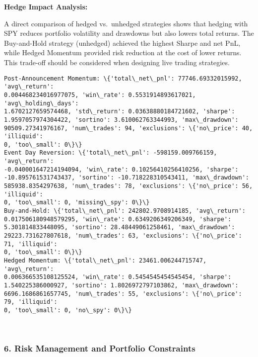 \documentclass[11pt]{article}
\begin{document}
\textbf{Hedge Impact Analysis:}

A direct comparison of hedged vs.~unhedged strategies shows that hedging
with SPY reduces portfolio volatility and drawdowns but also lowers
total returns. The Buy-and-Hold strategy (unhedged) achieved the highest
Sharpe and net PnL, while Hedged Momentum provided risk reduction at the
cost of lower returns. This trade-off should be considered when
designing live trading strategies.

    \begin{Verbatim}[commandchars=\\\{\}]
Post-Announcement Momentum: \{'total\_net\_pnl': 77746.69332015992, 'avg\_return':
0.004468234016977075, 'win\_rate': 0.5531914893617021, 'avg\_holding\_days':
1.6702127659574468, 'std\_return': 0.03638880184721602, 'sharpe':
1.9597057974304422, 'sortino': 3.610062763344993, 'max\_drawdown':
90509.27341976167, 'num\_trades': 94, 'exclusions': \{'no\_price': 40, 'illiquid':
0, 'too\_small': 0\}\}
Event Day Reversion: \{'total\_net\_pnl': -598159.009766159, 'avg\_return':
-0.040001647214194094, 'win\_rate': 0.10256410256410256, 'sharpe':
-10.895761531743437, 'sortino': -10.718228310543411, 'max\_drawdown':
585938.8354297638, 'num\_trades': 78, 'exclusions': \{'no\_price': 56, 'illiquid':
0, 'too\_small': 0, 'missing\_spy': 0\}\}
Buy-and-Hold: \{'total\_net\_pnl': 242802.9708914185, 'avg\_return':
0.017506180948579295, 'win\_rate': 0.6349206349206349, 'sharpe':
5.301814833448095, 'sortino': 28.48449061258461, 'max\_drawdown':
29223.731627807618, 'num\_trades': 63, 'exclusions': \{'no\_price': 71, 'illiquid':
0, 'too\_small': 0\}\}
Hedged Momentum: \{'total\_net\_pnl': 23461.006244715747, 'avg\_return':
0.006366535108125524, 'win\_rate': 0.5454545454545454, 'sharpe':
1.540225386000927, 'sortino': 1.8026972797103862, 'max\_drawdown':
6696.1686861657745, 'num\_trades': 55, 'exclusions': \{'no\_price': 79, 'illiquid':
0, 'too\_small': 0, 'no\_spy': 0\}\}
    \end{Verbatim}

    \begin{center}
    \end{center}
    { \hspace*{\fill} \\}
    
    \subsubsection*{6. Risk Management and Portfolio
Constraints}\label{risk-management-and-portfolio-constraints}
\end{document}
